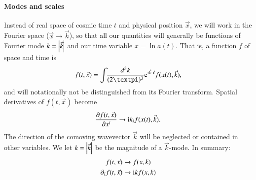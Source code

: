 \paragraph{Modes and scales}
    Instead of real space of cosmic time $t$ and physical position $\vec{x}$, we will work in the Fourier space ($\vec{x}\to\vec{k}$), so that all our quantities will generally be functions of Fourier mode $k=\abs{\vec{k}}$ and our time variable $x = \ln{a(t)}$. That is, a function $f$ of space and time is
    \begin{equation}
        f(t, \vec{x}) = \int \dkkk \eu^{\im \vec{k}\cdot \vec{x}}f(x(t), \vec{k}),
    \end{equation}
    and will notationally not be distinguished from its Fourier transform. Spatial derivatives of $f(t, \vec{x})$ become
    \begin{equation}
        \pdv{f(t, \vec{x})}{x^i} \to \mathrm{i} k_i f(x(t),\vec{k}).
    \end{equation}
    The direction of the comoving wavevector $\vec{k}$ will be neglected or contained in other variables. We let $k=\abs{\vec{k}}$ be the magnitude of a $\vec{k}$-mode. In summary:
    \begin{equation}
    \begin{split}
        f(t, \vec{x}) &\to f(x, k) \\
        \partial_i f(t, \vec{x}) &\to \mathrm{i} k f(x, k)
    \end{split}
    \end{equation}

